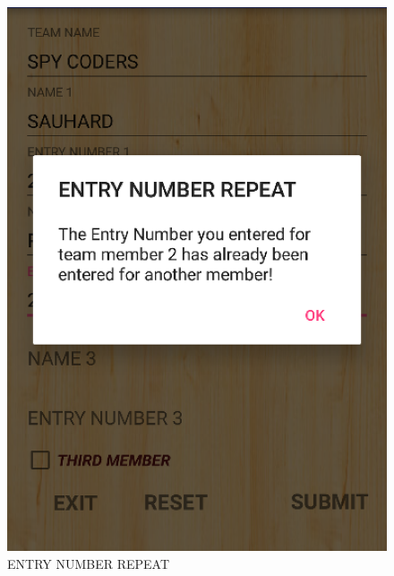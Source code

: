 \documentclass[12pt]{article}
\begin{document}
\begin{itemize}
\begin{itemize}
\begin{figure}
	\includegraphics[scale=.7]{ENTRY_NUMBER_REPEAT.png}
	\caption{ENTRY NUMBER REPEAT}
\end{figure}


\end{itemize}
\end{itemize}
\end{document}
